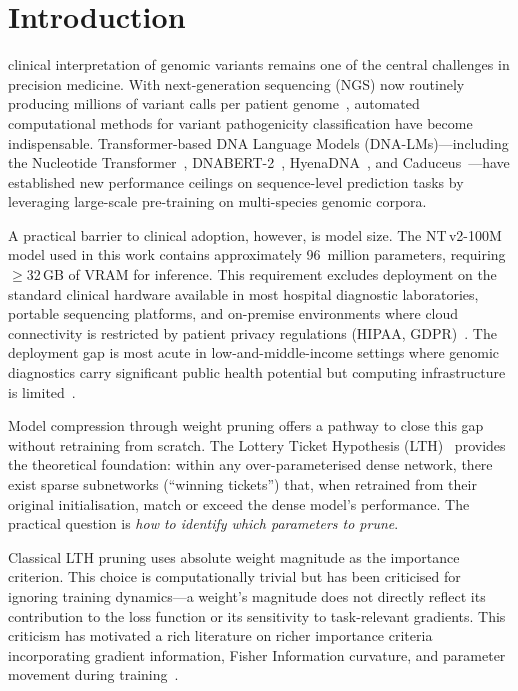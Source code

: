 \documentclass[journal]{IEEEtran}
\newcommand{\ntv}{NT\,v2-100M}
\begin{document}
\section{Introduction}
\label{sec:intro}

 clinical interpretation of genomic variants
remains one of the central challenges in precision medicine.
With next-generation sequencing (NGS) now routinely producing
millions of variant calls per patient genome~\cite{Stephens2015},
automated computational methods for variant pathogenicity
classification have become indispensable.
Transformer-based DNA Language Models (DNA-LMs)---including the
Nucleotide Transformer~\cite{Dalla-Torre2023},
DNABERT-2~\cite{Zhou2023}, HyenaDNA~\cite{Nguyen2024}, and
Caduceus~\cite{Schiff2024}---have established new performance
ceilings on sequence-level prediction tasks by leveraging
large-scale pre-training on multi-species genomic corpora.

A practical barrier to clinical adoption, however, is model size.
The \ntv{} model used in this work contains approximately 96~million
parameters, requiring $\geq$32\,GB of VRAM for inference.
This requirement excludes deployment on the standard clinical
hardware available in most hospital diagnostic laboratories,
portable sequencing platforms, and on-premise environments where
cloud connectivity is restricted by patient privacy regulations
(HIPAA, GDPR)~\cite{Price2019}.
The deployment gap is most acute in low-and-middle-income
settings where genomic diagnostics carry significant public
health potential but computing infrastructure is
limited~\cite{Sirugo2019}.

Model compression through weight pruning offers a pathway to
close this gap without retraining from scratch.
The Lottery Ticket Hypothesis (LTH)~\cite{Frankle2019} provides
the theoretical foundation: within any over-parameterised dense
network, there exist sparse subnetworks (``winning tickets'')
that, when retrained from their original initialisation, match
or exceed the dense model's performance.
The practical question is \emph{how to identify which parameters
to prune}.

Classical LTH pruning uses absolute weight magnitude as the
importance criterion.
This choice is computationally trivial but has been criticised
for ignoring training dynamics---a weight's magnitude does not
directly reflect its contribution to the loss function or its
sensitivity to task-relevant gradients.
This criticism has motivated a rich literature on richer
importance criteria incorporating gradient information, Fisher
Information curvature, and parameter movement during
training~\cite{Molchanov2017,LeCun1990,Hassibi1993}.
\end{document}
